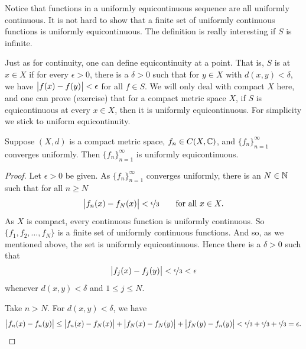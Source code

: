 Notice that functions in a uniformly equicontinuous sequence are
all uniformly continuous.  It is 
not hard to show that a finite set of uniformly continuous functions
is uniformly equicontinuous.  The definition is really interesting
if $S$ is infinite.

Just as for continuity, one can define equicontinuity at a point.
That is, $S$ is \emph{} at $x \in X$
if for every $\epsilon > 0$, there is a $\delta > 0$
such that for $y \in X$ with $d(x,y) < \delta$, we have
$\bigl\lvert {f(x)-f(y)} \bigr\rvert < \epsilon$ for all $f \in S$.
We will only deal with compact $X$ here, and
one can prove (exercise) that for a compact metric space $X$,
if $S$ is equicontinuous at every $x \in X$,
then it is uniformly equicontinuous.  For simplicity
we stick to uniform equicontinuity.

\begin{prop}
Suppose $(X,d)$ is a compact metric space,
$f_n \in C(X,{\mathbb{C}})$, and $\{ f_n \}_{n=1}^\infty$
converges uniformly.  Then $\{ f_n \}_{n=1}^\infty$ is uniformly equicontinuous.
\end{prop}

\begin{proof}
Let $\epsilon > 0$ be given.
As $\{ f_n \}_{n=1}^\infty$ converges uniformly, there is an $N \in {\mathbb{N}}$ such that for
all $n \geq N$
\begin{equation*}
\bigl\lvert {f_n(x)-f_N(x)} \bigr\rvert < \nicefrac{\epsilon}{3} \qquad \text{for all } x \in X.
\end{equation*}
As $X$ is compact, every continuous function is uniformly continuous.
So $\{ f_1,f_2,\ldots,f_N \}$ is a finite set of uniformly continuous
functions.  And so, as we mentioned above, the set is uniformly equicontinuous.
Hence there is a $\delta > 0$ such that
\begin{equation*}
\bigl\lvert {f_j(x)-f_j(y)} \bigr\rvert < \nicefrac{\epsilon}{3} < \epsilon
\end{equation*}
whenever $d(x,y) < \delta$ and $1 \leq j \leq N$.

Take $n > N$.  For $d(x,y) < \delta$, we have
\begin{equation*}
\bigl\lvert {f_n(x)-f_n(y)} \bigr\rvert
\leq
\bigl\lvert {f_n(x)-f_N(x)} \bigr\rvert
+
\bigl\lvert {f_N(x)-f_N(y)} \bigr\rvert
+
\bigl\lvert {f_N(y)-f_n(y)} \bigr\rvert
<
\nicefrac{\epsilon}{3}
+
\nicefrac{\epsilon}{3}
+
\nicefrac{\epsilon}{3}
=\epsilon . \qedhere
\end{equation*}
\end{proof}

